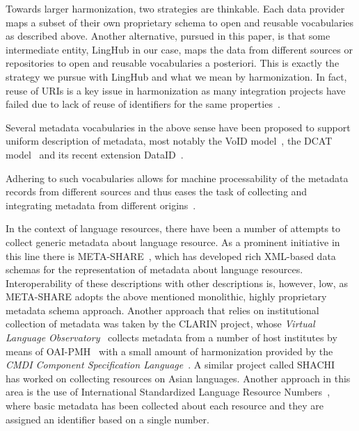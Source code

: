 \documentclass[smallextended]{svjour3}       %
\begin{document}
Towards larger harmonization, two strategies are thinkable. Each data provider
maps a subset of their own proprietary schema to open and reusable vocabularies
as described above. Another alternative, pursued in this paper, is that some
intermediate entity, LingHub in our case, maps the data from different sources
or repositories to open and reusable vocabularies a posteriori.  
This is exactly the strategy we pursue with LingHub and what we mean by
harmonization. In fact, reuse of URIs is a key issue in harmonization as many
integration projects have failed due to lack of reuse of identifiers for the
same properties~\cite{kemps2008isocat}. 

Several metadata vocabularies in the above sense have been proposed to support
uniform description of metadata, most notably the VoID
model~\cite{alexander2011describing}, the
DCAT model~\cite{maali2014data} and its recent extension
DataID~\cite{brummer2014dataid}. 

Adhering to such vocabularies allows for machine processability of the metadata
records from different sources and thus eases the task of collecting and
integrating metadata from different origins~\cite{jenkins1999automatic}. 

In the context of language resources, there have been a number of attempts to
collect generic metadata about language resource. As a prominent initiative in
this line there is 
META-SHARE~\cite{gavrilidou2012meta,piperidis2012meta}, which has developed rich
XML-based data schemas for the representation of metadata about language
resources. Interoperability of these descriptions with other descriptions is,
however, low, as META-SHARE adopts the above mentioned monolithic, highly
proprietary metadata schema approach. Another approach that
relies on institutional collection of metadata was taken by the CLARIN project,
whose \emph{Virtual Language Observatory}~\cite{van2012semantic} collects
metadata from a number of host institutes by means of
OAI-PMH~\cite{sompel2004resource} with a small amount of harmonization provided
by the \emph{CMDI Component 
Specification Language}~\cite{broeder2012cmdi}. A similar project called
SHACHI~\cite{tohyama2008shachi} has worked on collecting resources on Asian
languages. Another approach in this area is the use of International Standardized
Language Resource Numbers~\cite[ISLRN]{choukri2012using}, where basic metadata
has been collected about each resource and they are assigned an identifier based
on a single number. 
\end{document}

